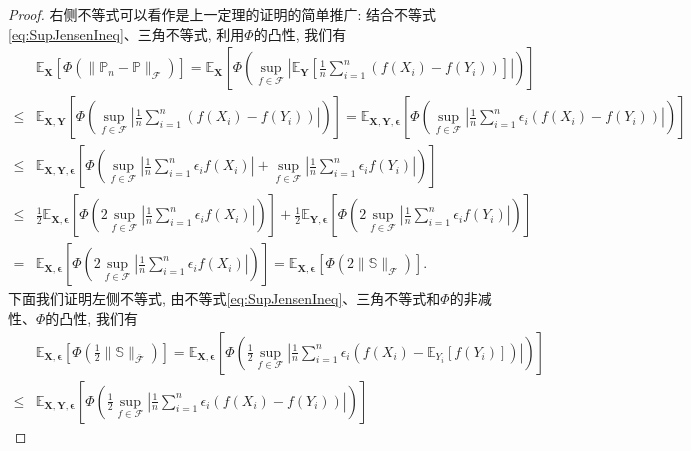 \begin{proof}
	右侧不等式可以看作是上一定理的证明的简单推广: 结合不等式\eqref{eq:SupJensenIneq}、三角不等式, 利用$\Phi$的凸性, 我们有
	\begin{align*}
		& \mathbb{E}_{\bm{X}} \left[ \Phi\left(\|\mathbb{P}_n - \mathbb{P}\|_{\mathscr{F}}\right)\right]
		= \mathbb{E}_{\bm{X}} \left[ \Phi\left( \sup_{f \in \mathscr{F}} \left| \mathbb{E}_{\bm{Y}} \left[ \frac{1}{n} \sum_{i=1}^n \left( f(X_i) - f(Y_i) \right) \right] \right| \right)\right] \\
		\leq & \mathbb{E}_{\bm{X}, \bm{Y}} \left[ \Phi\left( \sup_{f \in \mathscr{F}} \left| \frac{1}{n} \sum_{i=1}^n \left( f(X_i) - f(Y_i) \right)  \right| \right)\right]
		= \mathbb{E}_{\bm{X}, \bm{Y}, \bm{\epsilon}} \left[ \Phi\left( \sup_{f \in \mathscr{F}} \left| \frac{1}{n} \sum_{i=1}^n \epsilon_i \left( f(X_i) - f(Y_i) \right)  \right| \right)\right] \\
		\leq & \mathbb{E}_{\bm{X}, \bm{Y}, \bm{\epsilon}} \left[ \Phi\left( \sup_{f \in \mathscr{F}} \left| \frac{1}{n} \sum_{i=1}^n \epsilon_i f(X_i) \right| + \sup_{f \in \mathscr{F}} \left| \frac{1}{n} \sum_{i=1}^n \epsilon_i f(Y_i) \right| \right)\right] \\
		\leq & \frac{1}{2} \mathbb{E}_{\bm{X}, \bm{\epsilon}} \left[ \Phi\left( 2 \sup_{f \in \mathscr{F}} \left| \frac{1}{n} \sum_{i=1}^n \epsilon_i f(X_i) \right| \right)\right] + \frac{1}{2} \mathbb{E}_{\bm{Y}, \bm{\epsilon}} \left[ \Phi\left( 2 \sup_{f \in \mathscr{F}} \left| \frac{1}{n} \sum_{i=1}^n \epsilon_i f(Y_i) \right| \right)\right] \\
		= & \mathbb{E}_{\bm{X}, \bm{\epsilon}} \left[ \Phi\left( 2 \sup_{f \in \mathscr{F}} \left| \frac{1}{n} \sum_{i=1}^n \epsilon_i f(X_i) \right| \right)\right]
		= \mathbb{E}_{\bm{X}, \bm{\epsilon}} \left[ \Phi\left(2 \|\mathbb{S}\|_{\mathscr{F}} \right)\right].  
	\end{align*}
	下面我们证明左侧不等式, 由不等式\eqref{eq:SupJensenIneq}、三角不等式和$\Phi$的非减性、$\Phi$的凸性, 我们有
	\begin{align*}
		& \mathbb{E}_{\bm{X}, \bm{\epsilon}} \left[ \Phi\left(\frac{1}{2} \|\mathbb{S}\|_{\bar{\mathscr{F}}} \right)\right]
		= \mathbb{E}_{\bm{X}, \bm{\epsilon}} \left[ \Phi\left(\frac{1}{2} \sup_{f \in \mathscr{F}} \left| \frac{1}{n} \sum_{i=1}^n \epsilon_i \left( f(X_i) - \mathbb{E}_{Y_i}[f(Y_i)] \right)  \right| \right)\right] \\
		\leq & \mathbb{E}_{\bm{X}, \bm{Y}, \bm{\epsilon}} \left[ \Phi\left(\frac{1}{2} \sup_{f \in \mathscr{F}} \left| \frac{1}{n} \sum_{i=1}^n \epsilon_i \left( f(X_i) - f(Y_i) \right)  \right| \right)\right] 

\end{align*}
\end{proof}
